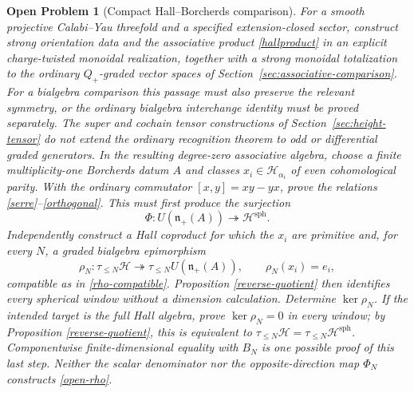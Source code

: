 \documentclass[11pt]{article}
\newtheorem{problem}[theorem]{Open Problem}
\begin{document}
\begin{problem}[Compact Hall--Borcherds comparison]
For a smooth projective Calabi--Yau threefold and a specified
extension-closed sector, construct strong orientation data and the
associative product \eqref{hallproduct} in an explicit charge-twisted
monoidal realization, together with a strong monoidal totalization to the
ordinary $Q_+$-graded vector spaces of
Section~\ref{sec:associative-comparison}. For a bialgebra comparison this
passage must also preserve the relevant symmetry, or the ordinary
bialgebra interchange identity must be proved separately.
The super and cochain tensor constructions of
Section~\ref{sec:height-tensor} do not extend the ordinary recognition
theorem to odd or differential graded generators. In the resulting
degree-zero associative algebra, choose a finite multiplicity-one
Borcherds datum $A$ and classes
$x_i\in\mathcal H_{\alpha_i}$ of even cohomological parity.  With the
ordinary commutator $[x,y]=xy-yx$, prove the relations
\eqref{serre}--\eqref{orthogonal}.  This must first produce the surjection
\[
 \Phi:U(\mathfrak n_+(A))\twoheadrightarrow
       \mathcal H^{\mathrm{sph}}.
\]
Independently construct a Hall coproduct for which the $x_i$ are primitive
and, for every $N$, a graded bialgebra epimorphism
\begin{equation}
 \rho_N:\tau_{\leq N}\mathcal H\twoheadrightarrow
 \tau_{\leq N}U(\mathfrak n_+(A)),\qquad \rho_N(x_i)=e_i,    \label{open-rho}
\end{equation}
compatible as in \eqref{rho-compatible}.  Proposition
\ref{reverse-quotient} then identifies every spherical window without a
dimension calculation.  Determine $\ker\rho_N$.  If the intended target is
the full Hall algebra, prove $\ker\rho_N=0$ in every window; by Proposition
\ref{reverse-quotient}, this is equivalent to
$\tau_{\leq N}\mathcal H=\tau_{\leq N}\mathcal H^{\mathrm{sph}}$.
Componentwise finite-dimensional equality with $B_N$ is one possible proof
of this last step.  Neither the scalar denominator nor the
opposite-direction map $\Phi_N$ constructs \eqref{open-rho}.


\end{problem}
\end{document}
